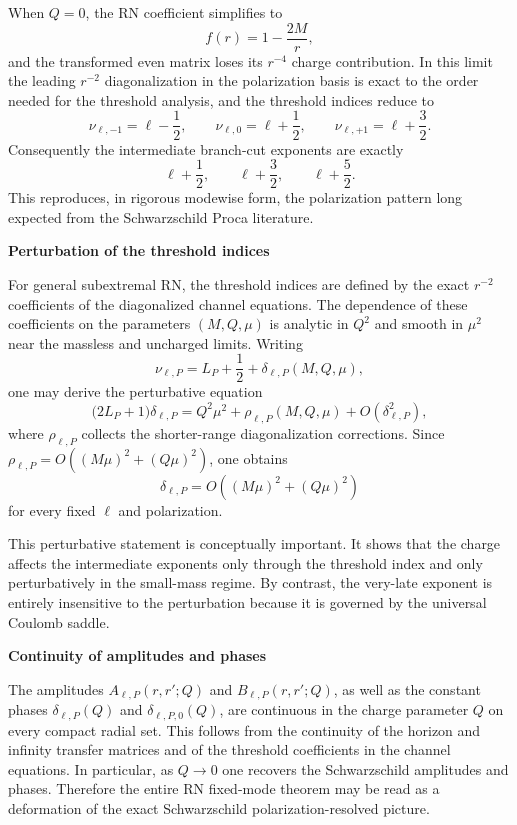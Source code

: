 \documentclass[12pt]{article}
\numberwithin{equation}{section}
\theoremstyle{plain}
\theoremstyle{definition}
\theoremstyle{remark}
\newcommand{\appheading}[1]{\par\medskip\noindent\textbf{#1}\par\smallskip\noindent}
\begin{document}
When $Q=0$, the RN coefficient simplifies to
\[
   f(r)=1-\frac{2M}{r},
\]
and the transformed even matrix loses its $r^{-4}$ charge contribution.  In this limit the leading $r^{-2}$ diagonalization in the polarization basis is exact to the order needed for the threshold analysis, and the threshold indices reduce to
\[
   \nu_{\ell,-1}=\ell-\frac12,\qquad
   \nu_{\ell,0}=\ell+\frac12,\qquad
   \nu_{\ell,+1}=\ell+\frac32.
\]
Consequently the intermediate branch-cut exponents are exactly
\[
   \ell+\frac12,\qquad \ell+\frac32,\qquad \ell+\frac52.
\]
This reproduces, in rigorous modewise form, the polarization pattern long expected from the Schwarzschild Proca literature.

\appheading{Perturbation of the threshold indices}

For general subextremal RN, the threshold indices are defined by the exact $r^{-2}$ coefficients of the diagonalized channel equations.  The dependence of these coefficients on the parameters $(M,Q,\mu)$ is analytic in $Q^2$ and smooth in $\mu^2$ near the massless and uncharged limits.  Writing
\[
   \nu_{\ell,P}=L_P+\frac12+\delta_{\ell,P}(M,Q,\mu),
\]
one may derive the perturbative equation
\begin{equation}\label{eq:appL_delta_equation}
   \bigl(2L_P+1\bigr)\delta_{\ell,P}
   =
   Q^2\mu^2+\rho_{\ell,P}(M,Q,\mu)
   +O(\delta_{\ell,P}^2),
\end{equation}
where $\rho_{\ell,P}$ collects the shorter-range diagonalization corrections.  Since $\rho_{\ell,P}=O((M\mu)^2+(Q\mu)^2)$, one obtains
\[
   \delta_{\ell,P}=O((M\mu)^2+(Q\mu)^2)
\]
for every fixed $\ell$ and polarization.

This perturbative statement is conceptually important.  It shows that the charge affects the intermediate exponents only through the threshold index and only perturbatively in the small-mass regime.  By contrast, the very-late exponent is entirely insensitive to the perturbation because it is governed by the universal Coulomb saddle.

\appheading{Continuity of amplitudes and phases}

The amplitudes $A_{\ell,P}(r,r';Q)$ and $B_{\ell,P}(r,r';Q)$, as well as the constant phases $\delta_{\ell,P}(Q)$ and $\delta_{\ell,P,0}(Q)$, are continuous in the charge parameter $Q$ on every compact radial set.  This follows from the continuity of the horizon and infinity transfer matrices and of the threshold coefficients in the channel equations.  In particular, as $Q\to0$ one recovers the Schwarzschild amplitudes and phases.  Therefore the entire RN fixed-mode theorem may be read as a deformation of the exact Schwarzschild polarization-resolved picture.
\end{document}
